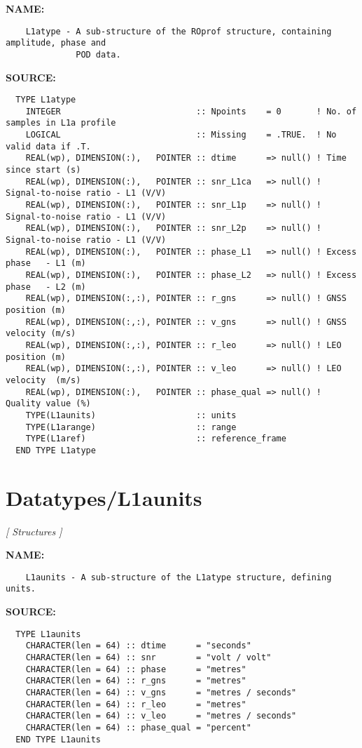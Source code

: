\label{ch:robo32}
\label{ch:Datatypes_L1atype}
\textbf{NAME:}\hspace{0.08in}\begin{Verbatim}
    L1atype - A sub-structure of the ROprof structure, containing amplitude, phase and
              POD data.
\end{Verbatim}
\textbf{SOURCE:}\hspace{0.08in}\begin{Verbatim}
  TYPE L1atype
    INTEGER                           :: Npoints    = 0       ! No. of samples in L1a profile
    LOGICAL                           :: Missing    = .TRUE.  ! No valid data if .T.
    REAL(wp), DIMENSION(:),   POINTER :: dtime      => null() ! Time since start (s)
    REAL(wp), DIMENSION(:),   POINTER :: snr_L1ca   => null() ! Signal-to-noise ratio - L1 (V/V)
    REAL(wp), DIMENSION(:),   POINTER :: snr_L1p    => null() ! Signal-to-noise ratio - L1 (V/V)
    REAL(wp), DIMENSION(:),   POINTER :: snr_L2p    => null() ! Signal-to-noise ratio - L1 (V/V)
    REAL(wp), DIMENSION(:),   POINTER :: phase_L1   => null() ! Excess phase   - L1 (m)
    REAL(wp), DIMENSION(:),   POINTER :: phase_L2   => null() ! Excess phase   - L2 (m)
    REAL(wp), DIMENSION(:,:), POINTER :: r_gns      => null() ! GNSS position (m)
    REAL(wp), DIMENSION(:,:), POINTER :: v_gns      => null() ! GNSS velocity (m/s)
    REAL(wp), DIMENSION(:,:), POINTER :: r_leo      => null() ! LEO  position (m)
    REAL(wp), DIMENSION(:,:), POINTER :: v_leo      => null() ! LEO velocity  (m/s)
    REAL(wp), DIMENSION(:),   POINTER :: phase_qual => null() ! Quality value (%)
    TYPE(L1aunits)                    :: units
    TYPE(L1arange)                    :: range
    TYPE(L1aref)                      :: reference_frame
  END TYPE L1atype
\end{Verbatim}
\section{Datatypes/L1aunits}
\textsl{[ Structures ]}

\label{ch:robo33}
\label{ch:Datatypes_L1aunits}
\textbf{NAME:}\hspace{0.08in}\begin{Verbatim}
    L1aunits - A sub-structure of the L1atype structure, defining units.
\end{Verbatim}
\textbf{SOURCE:}\hspace{0.08in}\begin{Verbatim}
  TYPE L1aunits
    CHARACTER(len = 64) :: dtime      = "seconds"
    CHARACTER(len = 64) :: snr        = "volt / volt"
    CHARACTER(len = 64) :: phase      = "metres"
    CHARACTER(len = 64) :: r_gns      = "metres"
    CHARACTER(len = 64) :: v_gns      = "metres / seconds"
    CHARACTER(len = 64) :: r_leo      = "metres"
    CHARACTER(len = 64) :: v_leo      = "metres / seconds"
    CHARACTER(len = 64) :: phase_qual = "percent"
  END TYPE L1aunits
\end{Verbatim}
